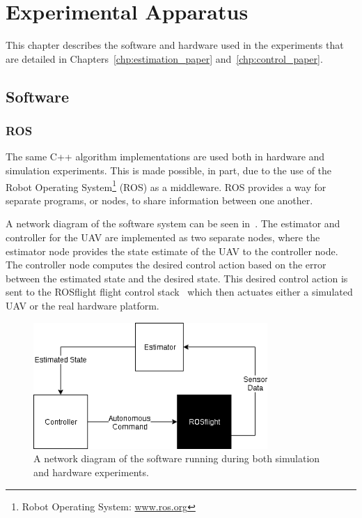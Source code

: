 
\chapter{Experimental Apparatus}
\label{chp:experimental_apparatus}

This chapter describes the software and hardware used in the experiments that
are detailed in Chapters~\ref{chp:estimation_paper} and~\ref{chp:control_paper}.

\section{Software}
\subsection {ROS}
The same C++ algorithm implementations are used both in hardware and simulation
experiments.
This is made possible, in part, due to the use of the Robot Operating System\footnote{Robot Operating System:
\href{www.ros.org}{www.ros.org}} (ROS) as a middleware. ROS provides a way for separate
programs, or nodes, to share information between one another.

A network diagram of the software system can be seen in~. The estimator and
controller for the UAV are implemented as two separate nodes, where the
estimator node provides the state estimate of the UAV to the controller node.
The controller node computes the desired control action based on the error
between the estimated state and the desired state. This desired control action
is sent to the ROSflight flight control stack~\cite{jackson2016rosflight}
which then actuates either a simulated UAV or the real hardware platform.

\begin{figure}[htbp]
  \centering
  \includegraphics[width=3.5in]{figures/roscopter.png}
  \caption[Software Architecture Network Diagram]{A network diagram of the
  software running during both simulation and hardware experiments.}
%
  \label{fig:network_diagram}
\end{figure}

